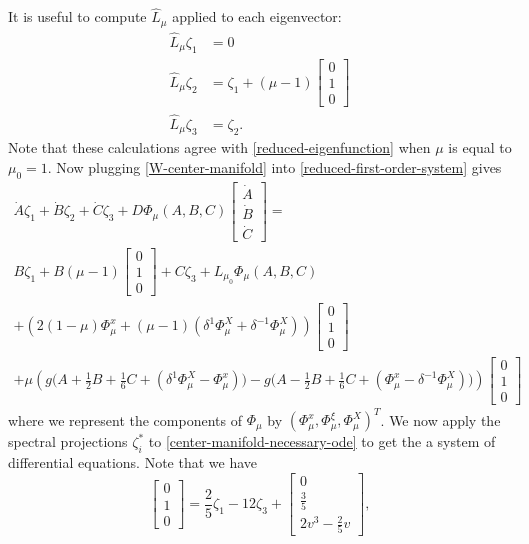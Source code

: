 It is useful to compute \(\widehat L_\mu\) applied to each eigenvector:
\begin{align}
	\widehat L_\mu \zeta_1 &= 0 \\
	\widehat L_\mu \zeta_2 &= \zeta _1  + (\mu-1)\begin{bmatrix}0 \\ 1 \\ 0 \end{bmatrix} \\
	\widehat L_\mu \zeta_3 &= \zeta_2.
\end{align}
Note that these calculations agree with \cref{reduced-eigenfunction} when \(\mu\) is equal to \(\mu_0 = 1\). Now plugging \cref{W-center-manifold} into \cref{reduced-first-order-system} gives
\begin{multline}\label{center-manifold-necessary-ode}
	\dot A \zeta_1 + \dot B \zeta_2 + \dot C \zeta_3 + D\Phi_\mu(A,B,C) \begin{bmatrix} \dot A \\ \dot B \\ \dot C \end{bmatrix} = \\
	B \zeta_1 + B(\mu-1) \begin{bmatrix}0 \\ 1 \\ 0 \end{bmatrix} + C \zeta_3 + L_{\mu_0} \Phi_\mu(A,B,C) \\
	+ \left(2(1-\mu) \Phi_\mu^x + (\mu-1)(\delta^1 \Phi_\mu^X + \delta^{-1} \Phi_\mu^X)\right) \begin{bmatrix}0 \\ 1 \\ 0 \end{bmatrix} \\
	+ \mu\left( g\big(A + \frac 1 2 B + \frac 1 6 C + (\delta^1 \Phi_\mu^X -\Phi_\mu^x)\big) - g\big(A - \frac 1 2 B + \frac 1 6 C + (\Phi_\mu^x - \delta^{-1} \Phi_\mu^X)\big) \right) \begin{bmatrix}0 \\ 1 \\ 0 \end{bmatrix}
\end{multline}
where we represent the components of \(\Phi_\mu\) by \((\Phi_\mu^x, \Phi_\mu^\xi, \Phi_\mu^X)^T\). We now apply the spectral projections \(\zeta_i^*\) to \cref{center-manifold-necessary-ode} to get the a system of differential equations. Note that we have 
\begin{equation}
	\begin{bmatrix}
		0 \\ 1 \\ 0 
	\end{bmatrix} = \frac 25 \zeta_1 - 12 \zeta_3 + \begin{bmatrix}
	0 \\ \frac 3 5 \\ 2v^3 - \frac 2 5 v
\end{bmatrix},
\end{equation}
